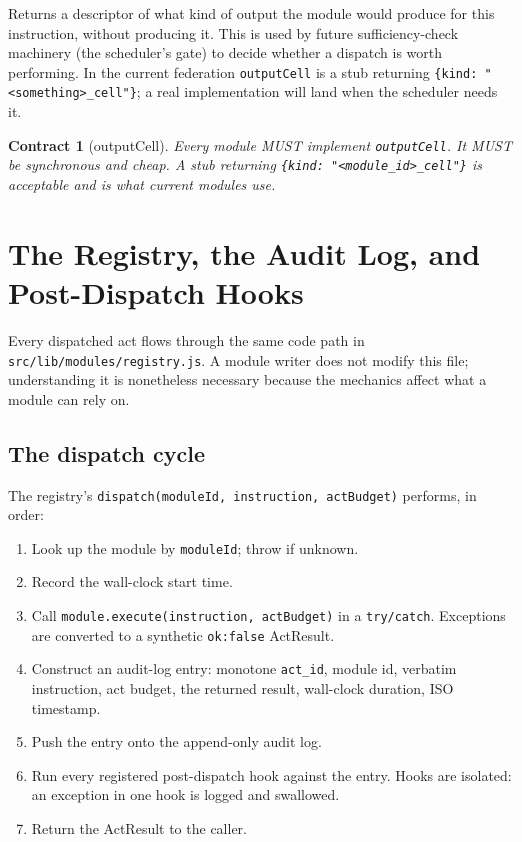 \documentclass[11pt,a4paper]{article}
\theoremstyle{contract}
\newtheorem{contract}{Contract}[section]
\begin{document}
Returns a descriptor of what kind of output the module would produce for
this instruction, without producing it. This is used by future
sufficiency-check machinery (the scheduler's gate) to decide whether a
dispatch is worth performing. In the current federation
\texttt{outputCell} is a stub returning \texttt{\{kind: "<something>\_cell"\}};
a real implementation will land when the scheduler needs it.

\begin{contract}[outputCell]
\label{contract:outputcell}
Every module MUST implement \texttt{outputCell}. It MUST be synchronous
and cheap. A stub returning \texttt{\{kind: "<module\_id>\_cell"\}} is
acceptable and is what current modules use.
\end{contract}

\section{The Registry, the Audit Log, and Post-Dispatch Hooks}
\label{sec:registry-mechanics}

Every dispatched act flows through the same code path in
\texttt{src/lib/modules/registry.js}. A module writer does not modify
this file; understanding it is nonetheless necessary because the
mechanics affect what a module can rely on.

\subsection{The dispatch cycle}

The registry's \texttt{dispatch(moduleId, instruction, actBudget)}
performs, in order:

\begin{enumerate}[leftmargin=1.6em,itemsep=1pt]
\item Look up the module by \texttt{moduleId}; throw if unknown.
\item Record the wall-clock start time.
\item Call \texttt{module.execute(instruction, actBudget)} in a
\texttt{try/catch}. Exceptions are converted to a synthetic
\texttt{ok:false} ActResult.
\item Construct an audit-log entry: monotone \texttt{act\_id}, module
id, verbatim instruction, act budget, the returned result, wall-clock
duration, ISO timestamp.
\item Push the entry onto the append-only audit log.
\item Run every registered post-dispatch hook against the entry.
Hooks are isolated: an exception in one hook is logged and swallowed.
\item Return the ActResult to the caller.
\end{enumerate}
\end{document}
